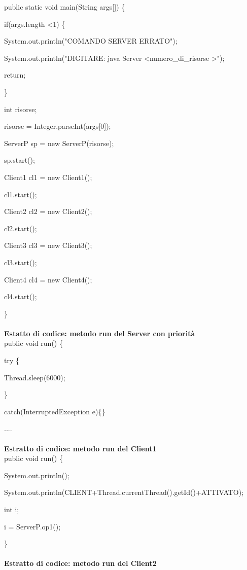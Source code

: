 \documentclass[10pt, a4paper]{article}
\begin{document}
public static void main(String args[]) \{

        if(args.length \textless 1) \{

            System.out.println("COMANDO SERVER ERRATO");

            System.out.println("DIGITARE: java Server \textless numero\_di\_risorse \textgreater");

            return;

        \}

        int risorse;

        risorse = Integer.parseInt(args[0]);

        ServerP sp = new ServerP(risorse);

        sp.start();

	Client1 cl1 = new Client1();

	cl1.start();

	Client2 cl2 = new Client2();

	cl2.start();

	Client3 cl3 = new Client3();

	cl3.start();

	Client4 cl4 = new Client4();

	cl4.start();

\}
\\\\
\textbf{Estatto di codice: metodo run del Server con priorità}
\\

public void run() \{

try \{ 

		Thread.sleep(6000);

	\}

	catch(InterruptedException e)\{\}

.... 
\\\\
\textbf{Estratto di codice: metodo run del Client1}
\\

public void run() \{

		System.out.println();

        	System.out.println(CLIENT+Thread.currentThread().getId()+ATTIVATO);

		int i;

		i = ServerP.op1();

\}
\\\\
\textbf{Estratto di codice: metodo run del Client2}
\\
\end{document}
